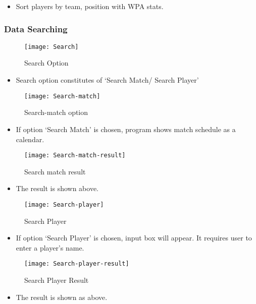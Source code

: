 \documentclass[conference,compsoc, twocolumn]{IEEEtran}
\begin{document}
\begin{itemize}
\item Sort players by team, position with WPA stats.
\end{itemize}


\subsubsection{Data Searching}
\begin{figure}[h]
\centering\texttt{[image: Search]}
\caption{Search Option}
\end{figure}
\begin{itemize}
\item Search option constitutes of  ‘Search Match/ Search Player’
\end{itemize}

\begin{figure}[h]
\centering\texttt{[image: Search-match]}
\caption{Search-match option}
\end{figure}
\begin{itemize}
\item If option ‘Search Match’ is chosen, program shows match schedule as a calendar.
\end{itemize}

\begin{figure}[h]
\centering\texttt{[image: Search-match-result]}
\caption{Search match result}
\end{figure}
\begin{itemize}
\item The result is shown above.
\end{itemize}

\begin{figure}[h]
\centering\texttt{[image: Search-player]}
\caption{Search Player}
\end{figure}
\begin{itemize}
\item If option ‘Search Player’ is chosen, input box will appear. It requires user to enter a player’s name.
\end{itemize}

\begin{figure}[h]
\centering\texttt{[image: Search-player-result]}
\caption{Search Player Result}
\end{figure}
\begin{itemize}
\item The result is shown as above.
\end{itemize}
\end{document}
